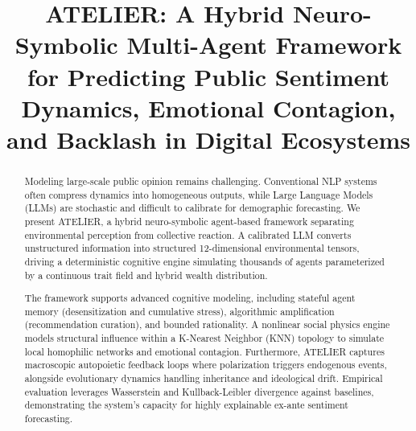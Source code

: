\documentclass[12pt]{IEEEtran}
\begin{document}
\title{ATELIER: A Hybrid Neuro-Symbolic Multi-Agent Framework for Predicting Public Sentiment Dynamics, Emotional Contagion, and Backlash in Digital Ecosystems}

\author{

}

\maketitle

\begin{abstract}
Modeling large-scale public opinion remains challenging. Conventional NLP systems often compress dynamics into homogeneous outputs, while Large Language Models (LLMs) are stochastic and difficult to calibrate for demographic forecasting. We present ATELIER, a hybrid neuro-symbolic agent-based framework separating environmental perception from collective reaction. A calibrated LLM converts unstructured information into structured 12-dimensional environmental tensors, driving a deterministic cognitive engine simulating thousands of agents parameterized by a continuous trait field and hybrid wealth distribution.

The framework supports advanced cognitive modeling, including stateful agent memory (desensitization and cumulative stress), algorithmic amplification (recommendation curation), and bounded rationality. A nonlinear social physics engine models structural influence within a K-Nearest Neighbor (KNN) topology to simulate local homophilic networks and emotional contagion. Furthermore, ATELIER captures macroscopic autopoietic feedback loops where polarization triggers endogenous events, alongside evolutionary dynamics handling inheritance and ideological drift. Empirical evaluation leverages Wasserstein and Kullback-Leibler divergence against baselines, demonstrating the system's capacity for highly explainable ex-ante sentiment forecasting.
\end{abstract}
\end{document}
